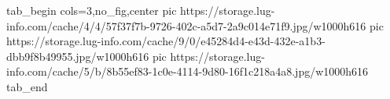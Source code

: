  
 
 
 
 


\ifcmt
  tab_begin cols=3,no_fig,center
     pic https://storage.lug-info.com/cache/4/4/57f37f7b-9726-402c-a5d7-2a9c014e71f9.jpg/w1000h616%
		 pic https://storage.lug-info.com/cache/9/0/e45284d4-e43d-432e-a1b3-dbb9f8b49955.jpg/w1000h616%
		 pic https://storage.lug-info.com/cache/5/b/8b55ef83-1c0e-4114-9d80-16f1c218a4a8.jpg/w1000h616%
  tab_end
\fi
